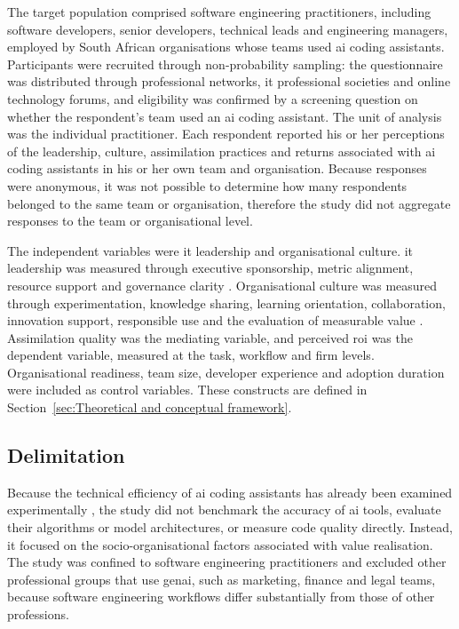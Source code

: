 The target population comprised software engineering practitioners, including software developers, senior developers, technical leads and engineering managers, employed by South African organisations whose teams used \gls{ai} coding assistants. Participants were recruited through non-probability sampling: the questionnaire was distributed through professional networks, \gls{it} professional societies and online technology forums, and eligibility was confirmed by a screening question on whether the respondent's team used an \gls{ai} coding assistant. The unit of analysis was the individual practitioner. Each respondent reported his or her perceptions of the leadership, culture, assimilation practices and returns associated with \gls{ai} coding assistants in his or her own team and organisation. Because responses were anonymous, it was not possible to determine how many respondents belonged to the same team or organisation, therefore the study  did not aggregate responses to the team or organisational level.

The independent variables were \gls{it} leadership and organisational culture. \gls{it} leadership was measured through executive sponsorship, metric alignment, resource support and governance clarity \parencite{Johnk2021, Schneider2023, DORA2025}. Organisational culture was measured through experimentation, knowledge sharing, learning orientation, collaboration, innovation support, responsible use and the evaluation of measurable value \parencite{An2024, Murire2024}. Assimilation quality was the mediating variable, and perceived \gls{roi} was the dependent variable, measured at the task, workflow and firm levels. Organisational readiness, team size, developer experience and adoption duration were included as control variables. These constructs are defined in Section~\ref{sec:Theoretical and conceptual framework}.

\subsection{Delimitation} 
\label{subsec:ch1-delimitations}

Because the technical efficiency of \gls{ai} coding assistants has already been examined experimentally \parencite{Peng2023, Cui2026}, the study did not benchmark the accuracy of \gls{ai} tools, evaluate their algorithms or model architectures, or measure code quality directly. Instead, it focused on the socio-organisational factors associated with value realisation. The study was confined to software engineering practitioners and excluded other professional groups that use \gls{genai}, such as marketing, finance and legal teams, because software engineering workflows differ substantially from those of other professions.

